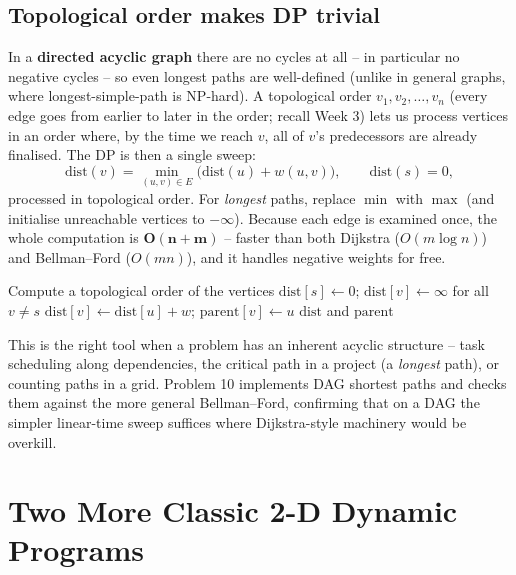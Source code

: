 \documentclass[11pt]{article}
\begin{document}
\subsection{Topological order makes DP trivial}

In a \textbf{directed acyclic graph} there are no cycles at all -- in particular no negative
cycles -- so even longest paths are well-defined (unlike in general graphs, where
longest-simple-path is NP-hard). A topological order $v_1, v_2, \ldots, v_n$ (every edge
goes from earlier to later in the order; recall Week 3) lets us process vertices in an order
where, by the time we reach $v$, all of $v$'s predecessors are already finalised. The DP is
then a single sweep:
\[
\mathrm{dist}(v) = \min_{(u,v) \in E} \big( \mathrm{dist}(u) + w(u,v) \big),
\qquad \mathrm{dist}(s) = 0,
\]
processed in topological order. For \emph{longest} paths, replace $\min$ with $\max$ (and
initialise unreachable vertices to $-\infty$). Because each edge is examined once, the whole
computation is $\mathbf{O(n + m)}$ -- faster than both Dijkstra ($O(m \log n)$) and
Bellman--Ford ($O(mn)$), and it handles negative weights for free.

\begin{algorithm}[h]
\caption{DAG Shortest Path (relax in topological order)}
\begin{algorithmic}[1]
\State Compute a topological order of the vertices
\State $\mathrm{dist}[s] \gets 0$; \quad $\mathrm{dist}[v] \gets \infty$ for all $v \ne s$
            \State $\mathrm{dist}[v] \gets \mathrm{dist}[u] + w$; \quad $\mathrm{parent}[v] \gets u$
        \EndIf
    \EndFor
\EndFor
\State \Return $\mathrm{dist}$ and $\mathrm{parent}$
\end{algorithmic}
\end{algorithm}

This is the right tool when a problem has an inherent acyclic structure -- task scheduling
along dependencies, the critical path in a project (a \emph{longest} path), or counting
paths in a grid. Problem 10 implements DAG shortest paths and checks them against the more
general Bellman--Ford, confirming that on a DAG the simpler linear-time sweep suffices where
Dijkstra-style machinery would be overkill.

\section{Two More Classic 2-D Dynamic Programs}
\end{document}
